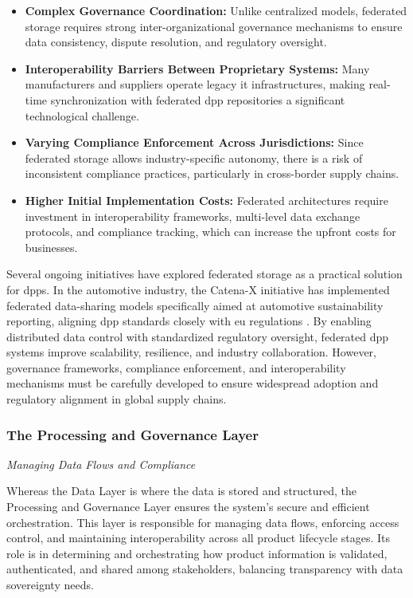\begin{itemize}[itemsep=0.5\baselineskip]
    \item \textbf{Complex Governance Coordination:} Unlike centralized models, federated storage requires strong inter-organizational governance mechanisms to ensure data consistency, dispute resolution, and regulatory oversight.\autocite{Alcayaga.2024}
    \item \textbf{Interoperability Barriers Between Proprietary Systems:} Many manufacturers and suppliers operate legacy \ac{it} infrastructures, making real-time synchronization with federated \ac{dpp} repositories a significant technological challenge. \autocite{Jansen.2023}
    \item \textbf{Varying Compliance Enforcement Across Jurisdictions:} Since federated storage allows industry-specific autonomy, there is a risk of inconsistent compliance practices, particularly in cross-border supply chains. \autocite{Ducuing.2023}
    \item \textbf{Higher Initial Implementation Costs:} Federated architectures require investment in interoperability frameworks, multi-level data exchange protocols, and compliance tracking, which can increase the upfront costs for businesses. \autocite{Redeker.2024}
\end{itemize}

Several ongoing initiatives have explored federated storage as a practical solution for \ac{dpp}s. In the automotive industry, the Catena-X initiative has implemented federated data-sharing models specifically aimed at automotive sustainability reporting, aligning \ac{dpp} standards closely with \ac{eu} regulations \autocite{Jousse.2024, Plociennik.2022}. By enabling distributed data control with standardized regulatory oversight, federated \ac{dpp} systems improve scalability, resilience, and industry collaboration. However, governance frameworks, compliance enforcement, and interoperability mechanisms must be carefully developed to ensure widespread adoption and regulatory alignment in global supply chains.

\subsubsection{The Processing and Governance Layer}
\textit{Managing Data Flows and Compliance}

Whereas the Data Layer is where the data is stored and structured, the Processing and
Governance Layer ensures the system's secure and efficient orchestration. This layer is responsible for managing data flows, enforcing access control, and maintaining interoperability across all
product lifecycle stages. Its role is in determining and orchestrating how product information is validated, authenticated, and shared among stakeholders, balancing transparency with data sovereignty needs. \autocite{Ducuing.2023, Jensen.2024}

